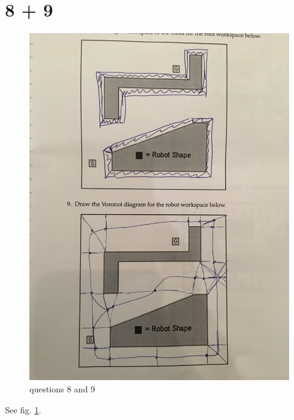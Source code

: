 \section{8 + 9}
\begin{figure}[htbp]
   \centering
   \includegraphics[width=\textwidth, angle=-90]{figs/89.jpg} %
   \caption{questions 8 and 9}
   \label{fig:89}
\end{figure}

See fig. \ref{fig:89}.


